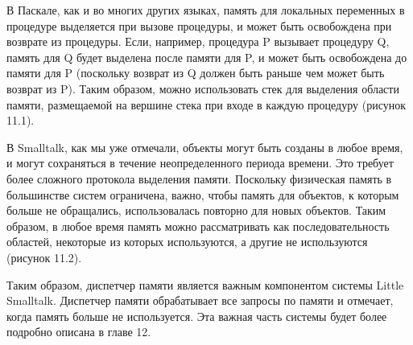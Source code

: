 
В Паскале, как и во многих других языках, память для локальных переменных в
процедуре выделяется при вызове процедуры, и может быть освобождена при возврате
из процедуры. Если, например, процедура P вызывает процедуру Q, память для Q
будет выделена после памяти для P, и может быть освобождена до памяти для P
(поскольку возврат из Q должен быть раньше чем может быть возврат из P). Таким
образом, можно использовать стек для выделения области памяти, размещаемой на
вершине стека при входе в каждую процедуру (рисунок 11.1).

В Smalltalk, как мы уже отмечали, объекты могут быть созданы в любое время, и
могут сохраняться в течение неопределенного периода времени. Это требует более
сложного протокола выделения памяти. Поскольку физическая память в большинстве
систем ограничена, важно, чтобы память для объектов, к которым больше не
обращались, использовалась повторно для новых объектов. Таким образом, в любое
время память можно рассматривать как последовательность областей, некоторые из
которых используются, а другие не используются (рисунок 11.2).

Таким образом, диспетчер памяти является важным компонентом системы Little
Smalltalk. Диспетчер памяти обрабатывает все запросы по памяти и отмечает, когда
память больше не используется. Эта важная часть системы будет более подробно
описана в главе 12.

